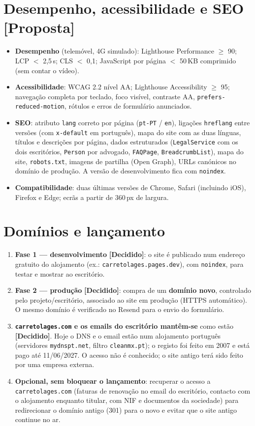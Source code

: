 \documentclass[11pt,a4paper]{article}
\newcommand{\decidido}{\textcolor{verde700}{\textbf{[Decidido]}}}
\newcommand{\proposta}{\textcolor{bronze}{\textbf{[Proposta]}}}
\begin{document}
\section{Desempenho, acessibilidade e SEO \proposta}
\begin{itemize}
  \item \textbf{Desempenho} (telemóvel, 4G simulado): Lighthouse Performance $\geq$ 90; LCP $<$ 2,5\,s; CLS $<$ 0,1; JavaScript por página $<$ 50\,KB comprimido (sem contar o vídeo).
  \item \textbf{Acessibilidade}: WCAG 2.2 nível AA; Lighthouse Accessibility $\geq$ 95; navegação completa por teclado, foco visível, contraste AA, \texttt{prefers-reduced-motion}, rótulos e erros de formulário anunciados.
  \item \textbf{SEO}: atributo \texttt{lang} correto por página (\texttt{pt-PT} / \texttt{en}), ligações \texttt{hreflang} entre versões (com \texttt{x-default} em português), mapa do site com as duas línguas, títulos e descrições por página, dados estruturados (\texttt{LegalService} com os dois escritórios, \texttt{Person} por advogado, \texttt{FAQPage}, \texttt{BreadcrumbList}), mapa do site, \texttt{robots.txt}, imagens de partilha (Open Graph), URLs canónicos no domínio de produção. A versão de desenvolvimento fica com \texttt{noindex}.
  \item \textbf{Compatibilidade}: duas últimas versões de Chrome, Safari (incluindo iOS), Firefox e Edge; ecrãs a partir de 360\,px de largura.
\end{itemize}

\section{Domínios e lançamento}\label{sec:dominios}
\begin{enumerate}
  \item \textbf{Fase 1 --- desenvolvimento} \decidido: o site é publicado num endereço gratuito do alojamento (ex.: \texttt{carretolages.pages.dev}), com \texttt{noindex}, para testar e mostrar ao escritório.
  \item \textbf{Fase 2 --- produção} \decidido: compra de um \textbf{domínio novo}, controlado pelo projeto/escritório, associado ao site em produção (HTTPS automático). O mesmo domínio é verificado no Resend para o envio do formulário.
  \item \textbf{\texttt{carretolages.com} e os emails do escritório mantêm-se} como estão \decidido. Hoje o DNS e o email estão num alojamento português (servidores \texttt{mydnspt.net}, filtro \texttt{cleanmx.pt}); o registo foi feito em 2007 e está pago até 11/06/2027. O acesso não é conhecido; o site antigo terá sido feito por uma empresa externa.
  \item \textbf{Opcional, sem bloquear o lançamento}: recuperar o acesso a \texttt{carretolages.com} (faturas de renovação no email do escritório, contacto com o alojamento enquanto titular, com NIF e documentos da sociedade) para redirecionar o domínio antigo (301) para o novo e evitar que o site antigo continue no ar.
\end{enumerate}
\end{document}
